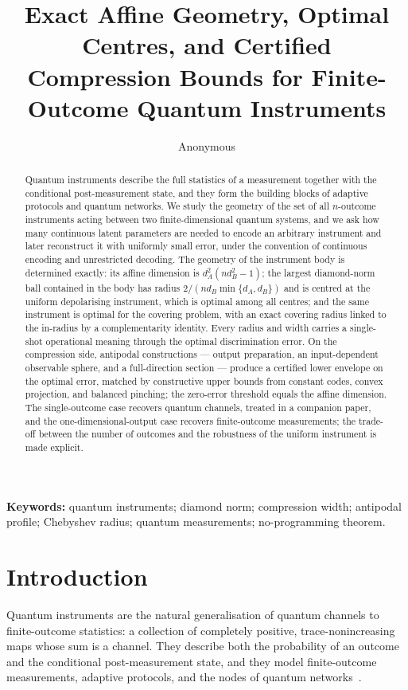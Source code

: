 \documentclass[11pt,a4paper]{article}
\title{\bf Exact Affine Geometry, Optimal Centres, and Certified Compression Bounds for Finite-Outcome Quantum Instruments}
\author{Anonymous}
\date{}
\begin{document}
\maketitle

\begin{abstract}
Quantum instruments describe the full statistics of a measurement together with the conditional post-measurement state, and they form the building blocks of adaptive protocols and quantum networks. We study the geometry of the set of all $n$-outcome instruments acting between two finite-dimensional quantum systems, and we ask how many continuous latent parameters are needed to encode an arbitrary instrument and later reconstruct it with uniformly small error, under the convention of continuous encoding and unrestricted decoding. The geometry of the instrument body is determined exactly: its affine dimension is $d_A^2(nd_B^2-1)$; the largest diamond-norm ball contained in the body has radius $2/(nd_B\min\{d_A,d_B\})$ and is centred at the uniform depolarising instrument, which is optimal among all centres; and the same instrument is optimal for the covering problem, with an exact covering radius linked to the in-radius by a complementarity identity. Every radius and width carries a single-shot operational meaning through the optimal discrimination error. On the compression side, antipodal constructions --- output preparation, an input-dependent observable sphere, and a full-direction section --- produce a certified lower envelope on the optimal error, matched by constructive upper bounds from constant codes, convex projection, and balanced pinching; the zero-error threshold equals the affine dimension. The single-outcome case recovers quantum channels, treated in a companion paper, and the one-dimensional-output case recovers finite-outcome measurements; the trade-off between the number of outcomes and the robustness of the uniform instrument is made explicit.
\end{abstract}

\noindent\textbf{Keywords:} quantum instruments; diamond norm; compression width; antipodal profile; Chebyshev radius; quantum measurements; no-programming theorem.


\tableofcontents

\section{Introduction}
\label{sec:intro}

Quantum instruments are the natural generalisation of quantum channels to finite-outcome statistics: a collection of completely positive, trace-nonincreasing maps whose sum is a channel. They describe both the probability of an outcome and the conditional post-measurement state, and they model finite-outcome measurements, adaptive protocols, and the nodes of quantum networks~\cite{DaviesLewis1970,Ozawa1984,ChiribellaEtAl2009Instruments,ChiribellaEtAl2008Combs}.
\end{document}
